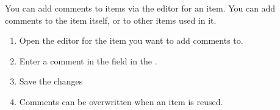 
You can add comments to items via the editor for an item. You can add comments to the item itself, or to other items used in it. 


\begin{enumerate}
\item Open the editor for the item you want to add comments to. 
\item Enter a comment in the  field in the  \gdpropview{}. 
\item Save the changes
\item Comments can be overwritten when an item is reused.
\end{enumerate}

